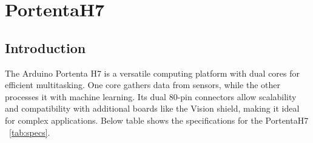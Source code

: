 
\chapter{PortentaH7}

	\section{Introduction}
	\label{sec:portentaH7}

The Arduino Portenta H7 is a versatile computing platform with dual cores for efficient multitasking. One core gathers data from sensors, while the other processes it with machine learning. Its dual 80-pin connectors allow scalability and compatibility with additional boards like the Vision shield, making it ideal for complex applications. Below table shows the specifications for the PortentaH7 ~\ref{tab:specs}. \cite{arduinoABX00042:2024}

